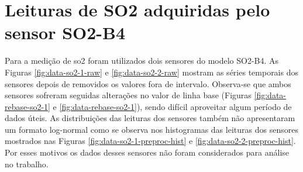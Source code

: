 \chapter{Leituras de SO2 adquiridas pelo sensor SO2-B4}\label{apendix:so2-readings}

Para a medição de \acrshort{so2} foram utilizados dois sensores do modelo SO2-B4. As Figuras \ref{fig:data-so2-1-raw} e \ref{fig:data-so2-2-raw} mostram as séries temporais dos sensores depois de removidos os valores fora de intervalo. Observa-se que ambos sensores sofreram seguidas alterações no valor de linha base (Figuras \ref{fig:data-rebase-so2-1} e \ref{fig:data-rebase-so2-1}), sendo difícil aproveitar algum período de dados úteis. As distribuições das leituras dos sensores também não apresentaram um formato log-normal como se observa nos histogramas das leituras dos sensores mostrados nas Figuras \ref{fig:data-so2-1-preproc-hist} e \ref{fig:data-so2-2-preproc-hist}. Por esses motivos os dados desses sensores não foram considerados para análise no trabalho.

